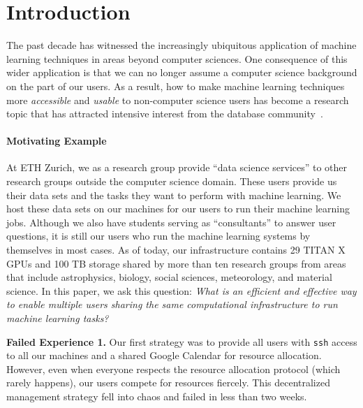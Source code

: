 \documentclass[letterpaper]{vldb}
\begin{document}
\vspace{-1em}
\section{Introduction}\label{sec:introduction}

The past decade has witnessed the increasingly 
ubiquitous application of machine learning techniques 
in areas beyond computer sciences. 
One consequence of this wider application
is that we can no longer assume a computer science 
background on the part of our users. As a result, how to make
machine learning techniques more {\em accessible} and
{\em usable} to non-computer science users has become
a research topic that has attracted intensive interest
from the database community~\cite{Bailis2017,Binnig2016,Krishnan2017,Tamagnini2017,Varma2017}.

\paragraph*{Motivating Example} At ETH Zurich,
we as a research group provide ``data science
services'' to other research groups outside the computer science domain.
These users provide
us their data sets and the tasks they 
want to perform with machine learning. We host these data sets on our machines
for our users to run their machine learning
jobs.
Although we also have students serving as ``consultants''
to answer user questions, it is still our
users who run the machine learning systems
by themselves in most cases. As of today, our infrastructure
contains 29 TITAN X GPUs and 100 TB storage
shared by more than ten research groups
from areas that include astrophysics,
biology, social sciences, meteorology, 
and material science.
In this paper, we ask this question: {\em What is an
efficient and effective way to enable multiple users sharing 
the same computational infrastructure to run
machine learning tasks?}

\vspace{0.1em}
\noindent
{\bf Failed Experience 1.} Our first strategy was to provide
all users with \texttt{ssh} access to all our machines
and a shared Google Calendar for resource allocation.
However, even when everyone respects the resource allocation
protocol (which rarely happens), our users compete for 
resources fiercely. This decentralized management strategy fell into chaos and failed in less than two weeks. 
\end{document}

